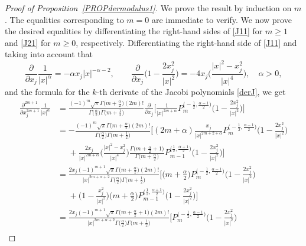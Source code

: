 \documentclass[reqno,11pt]{amsart}
\theoremstyle{definition}
\begin{document}
\begin{proof}[Proof of Proposition~\ref{PROPdermodulus1}]
	We prove the result by induction on $m$. The equalities corresponding to $m=0$ are immediate to verify. We now prove the desired equalities by differentiating the right-hand sides of \eqref{J11} for $m\geq 1$ and \eqref{J21} for $m\geq 0$, respectively. Differentiating the right-hand side of \eqref{J11} and taking into account that
	\begin{equation}
		\label{derr}
		\frac{\partial}{\partial x_j} \frac{1}{|x|^\alpha}=-\alpha x_j |x|^{-\alpha-2}, \qquad \frac{\partial}{\partial x_j} \bigg(1-\frac{2x_j^2}{|x|^2}\bigg)=-4x_j \bigg(\frac{|x|^2-x_j^2}{|x|^4}\bigg), \quad \alpha>0,
	\end{equation}
	and the formula for the $k$-th derivate of the Jacobi polynomials \eqref{derJ}, we get
	\begin{align*}
		\frac{\partial^{2m+1}}{\partial x_j^{2m+1}}\frac{1}{|x|^{\alpha}}&= \frac{(-1)^m \sqrt{\pi} \Gamma\big( m+\frac{\alpha}{2}\big) (2m)! }{\Gamma\big(\frac{\alpha}{2}\big)\Gamma\big( m+\frac{1}{2}\big)} \frac{\partial}{\partial x_j}\bigg[\frac{1}{|x|^{2m+\alpha}}P_m^{ \big(-\frac{1}{2},\frac{\alpha-1}{2}\big)}\bigg(1-\frac{2x_j^2}{|x|^2} \bigg)\bigg]\\
		&=-\frac{(-1)^m \sqrt{\pi} \Gamma\big( m+\frac{\alpha}{2}\big) (2m)! }{\Gamma\big(\frac{\alpha}{2}\big)\Gamma\big( m+\frac{1}{2}\big)} \bigg[(2m+\alpha) \frac{x_j}{|x|^{2m+2+\alpha}}P_m^{\big(-\frac{1}{2}, \frac{\alpha-1}{2}\big)}\bigg(1-\frac{2x_j^2}{|x|^2}\bigg) \\
		&\phantom{=} + \frac{2x_j}{|x|^{2m+\alpha}} \bigg(\frac{|x|^2-x_j^2}{|x|^4}\bigg)\frac{\Gamma\big(m+\frac{\alpha}{2}+1\big)}{\Gamma\big(m+\frac{\alpha}{2}\big)} P_{m-1}^{\big(\frac{1}{2}, \frac{\alpha+1}{2}\big)}\bigg(1-\frac{2x_j^2}{|x|^2}\bigg)\bigg]\\
		&=\frac{2x_j(-1)^{m+1} \sqrt{\pi} \Gamma\big( m+\frac{\alpha}{2}\big) (2m)! }{|x|^{2m+\alpha+2}\Gamma\big(\frac{\alpha}{2}\big)\Gamma\big( m+\frac{1}{2}\big)} \bigg[\Big(m+\frac{\alpha}{2}\Big)P_m^{\big(-\frac{1}{2}, \frac{\alpha-1}{2}\big)}\bigg(1-\frac{2x_j^2}{|x|^2}\bigg)\\
		&\phantom{=} +  \bigg(1-\frac{x_j^2}{|x|^2}\bigg)\Big(m+\frac{\alpha}{2}\Big) P_{m-1}^{\big(\frac{1}{2}, \frac{\alpha+1}{2}\big)}\bigg(1-\frac{2x_j^2}{|x|^2}\bigg)\bigg]\\
		&=\frac{2x_j(-1)^{m+1} \sqrt{\pi} \Gamma\big( m+\frac{\alpha}{2}+1\big) (2m)! }{|x|^{2m+\alpha+2}\Gamma\big(\frac{\alpha}{2}\big)\Gamma\big( m+\frac{1}{2}\big)}\bigg[P_m^{\big(-\frac{1}{2}, \frac{\alpha-1}{2}\big)}\bigg(1-\frac{2x_j^2}{|x|^2}\bigg)\\

\end{align*}
\end{proof}
\end{document}
